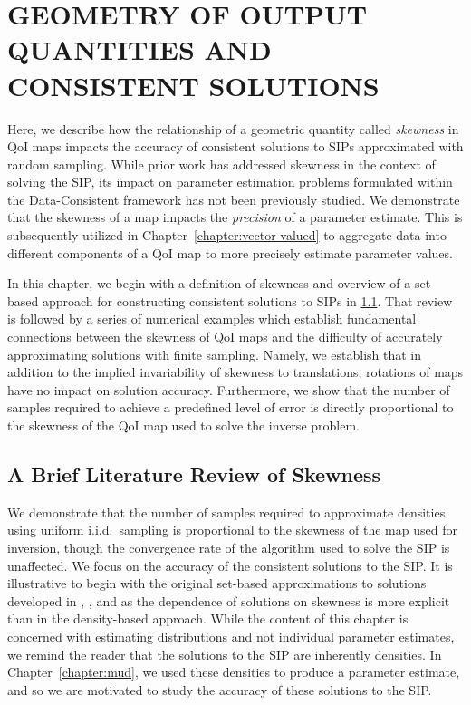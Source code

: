 \chapter{\uppercase{Geometry of Output Quantities and Consistent Solutions} \label{chapter:geometry}}

Here, we describe how the relationship of a geometric quantity called \emph{skewness} in QoI maps impacts the accuracy of consistent solutions to SIPs approximated with random sampling.
While prior work has addressed skewness in the context of solving the SIP, its impact on parameter estimation problems formulated within the Data-Consistent framework has not been previously studied.
We demonstrate that the skewness of a map impacts the \emph{precision} of a parameter estimate.
This is subsequently utilized in Chapter~\ref{chapter:vector-valued} to aggregate data into different components of a QoI map to more precisely estimate parameter values.

In this chapter, we begin with a definition of skewness and overview of a set-based approach for constructing consistent solutions to SIPs in \ref{sec:skewness}.
That review is followed by a series of numerical examples which establish fundamental connections between the skewness of QoI maps and the difficulty of accurately approximating solutions with finite sampling.
Namely, we establish that in addition to the implied invariability of skewness to translations, rotations of maps have no impact on solution accuracy.
Furthermore, we show that the number of samples required to achieve a predefined level of error is directly proportional to the skewness of the QoI map used to solve the inverse problem.

\section{A Brief Literature Review of Skewness}\label{sec:skewness}


We demonstrate that the number of samples required to approximate densities using uniform i.i.d.~sampling is proportional to the skewness of the map used for inversion, though the convergence rate of the algorithm used to solve the SIP is unaffected.
We focus on the accuracy of the consistent solutions to the SIP.
It is illustrative to begin with the original set-based approximations to solutions developed in \cite{BBE11}, \cite{BES12}, and \cite{BET+14} as the dependence of solutions on skewness is more explicit than in the density-based approach.
While the content of this chapter is concerned with estimating distributions and not individual parameter estimates, we remind the reader that the solutions to the SIP are inherently densities.
In Chapter~\ref{chapter:mud}, we used these densities to produce a parameter estimate, and so we are motivated to study the accuracy of these solutions to the SIP.


